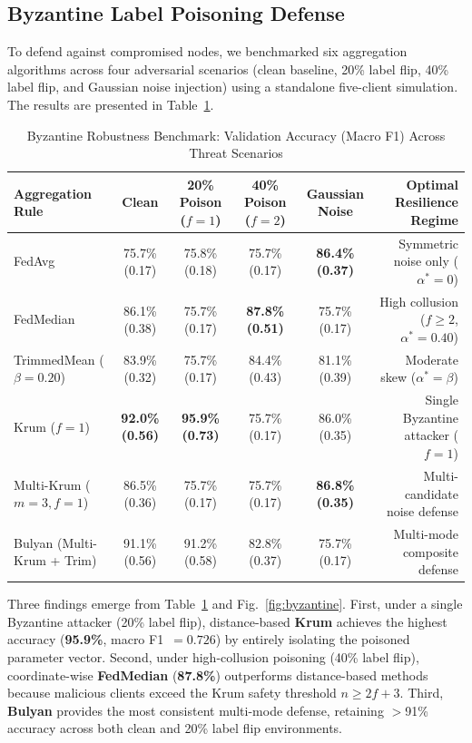 \documentclass[journal,10pt,twocolumn]{IEEEtran}
\begin{document}
\subsection{Byzantine Label Poisoning Defense}

To defend against compromised nodes, we benchmarked six aggregation algorithms across four adversarial scenarios (clean baseline, 20\% label flip, 40\% label flip, and Gaussian noise injection) using a standalone five-client simulation. The results are presented in Table~\ref{tab:byzantine_table}.

\begin{table}[t]
\caption{Byzantine Robustness Benchmark: Validation Accuracy (Macro F1) Across Threat Scenarios}
\label{tab:byzantine_table}
\centering
\footnotesize
\renewcommand{\arraystretch}{1.2}
\begin{tabular*}{\textwidth}{@{\extracolsep{\fill}}lccccr@{}}
\toprule
\textbf{Aggregation Rule} & \textbf{Clean} & \textbf{20\% Poison ($f{=}1$)} & \textbf{40\% Poison ($f{=}2$)} & \textbf{Gaussian Noise} & \textbf{Optimal Resilience Regime} \\
\midrule
FedAvg & 75.7\% (0.17) & 75.8\% (0.18) & 75.7\% (0.17) & \textbf{86.4\% (0.37)} & Symmetric noise only ($\alpha^*{=}0$) \\
FedMedian & 86.1\% (0.38) & 75.7\% (0.17) & \textbf{87.8\% (0.51)} & 75.7\% (0.17) & High collusion ($f{\ge}2$, $\alpha^*{=}0.40$) \\
TrimmedMean ($\beta{=}0.20$) & 83.9\% (0.32) & 75.7\% (0.17) & 84.4\% (0.43) & 81.1\% (0.39) & Moderate skew ($\alpha^*{=}\beta$) \\
Krum ($f{=}1$) & \textbf{92.0\% (0.56)} & \textbf{95.9\% (0.73)} & 75.7\% (0.17) & 86.0\% (0.35) & Single Byzantine attacker ($f{=}1$) \\
Multi-Krum ($m{=}3, f{=}1$) & 86.5\% (0.36) & 75.7\% (0.17) & 75.7\% (0.17) & \textbf{86.8\% (0.35)} & Multi-candidate noise defense \\
Bulyan (Multi-Krum + Trim) & 91.1\% (0.56) & 91.2\% (0.58) & 82.8\% (0.37) & 75.7\% (0.17) & Multi-mode composite defense \\
\bottomrule
\end{tabular*}
\end{table}

Three findings emerge from Table~\ref{tab:byzantine_table} and Fig.~\ref{fig:byzantine}. First, under a single Byzantine attacker (20\% label flip), distance-based \textbf{Krum} achieves the highest accuracy (\textbf{95.9\%}, macro F1~$=0.726$) by entirely isolating the poisoned parameter vector. Second, under high-collusion poisoning (40\% label flip), coordinate-wise \textbf{FedMedian} (\textbf{87.8\%}) outperforms distance-based methods because malicious clients exceed the Krum safety threshold $n \ge 2f + 3$. Third, \textbf{Bulyan} provides the most consistent multi-mode defense, retaining $>$91\% accuracy across both clean and 20\% label flip environments.
\end{document}
